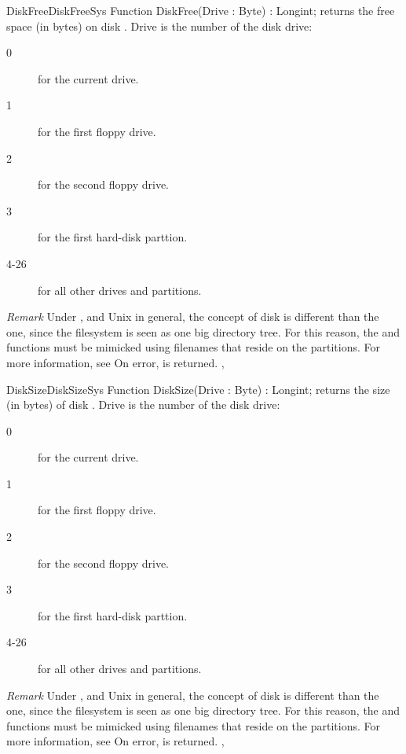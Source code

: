  
\begin{functionl}{DiskFree}{DiskFreeSys}
\Declaration
Function DiskFree(Drive : Byte) : Longint;
\Description
{} returns the free space (in bytes) on disk .
Drive is the number of the disk drive: 
\begin{description}
\item[0] for the current drive.
\item[1] for the first floppy drive.
\item[2] for the second floppy drive.
\item[3] for the first hard-disk parttion.
\item[4-26] for all other drives and partitions.
\end{description}

{\em Remark} Under \linux, and Unix in general, the concept of disk is
different than the \dos one, since the filesystem is seen as one big
directory tree. For this reason, the  and 
functions must be mimicked using filenames that reside on the partitions.
For more information, see 
\Errors
On error,  is returned.
\SeeAlso
{}, 
\end{functionl}


 
\begin{functionl}{DiskSize}{DiskSizeSys}
\Declaration
Function DiskSize(Drive : Byte) : Longint;
\Description
{} returns the size (in bytes) of disk .
Drive is the number of the disk drive: 
\begin{description}
\item[0] for the current drive.
\item[1] for the first floppy drive.
\item[2] for the second floppy drive.
\item[3] for the first hard-disk parttion.
\item[4-26] for all other drives and partitions.
\end{description}

{\em Remark} Under \linux, and Unix in general, the concept of disk is
different than the \dos one, since the filesystem is seen as one big
directory tree. For this reason, the  and 
functions must be mimicked using filenames that reside on the partitions.
For more information, see 
\Errors
On error,  is returned.
\SeeAlso
{}, 
\end{functionl}

